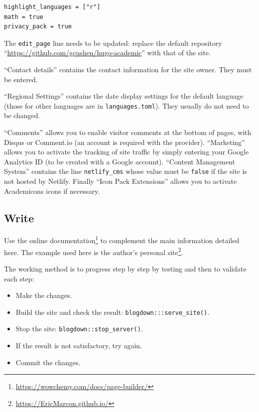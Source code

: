 \documentclass[
  12pt,
  american,
  a4paper,
  extrafontsizes,onecolumn,openright
  ]{memoir}
\providecommand{\tightlist}{%
  \setlength{\itemsep}{0pt}\setlength{\parskip}{0pt}}
\begin{document}
\begin{verbatim}
highlight_languages = ["r"] 
math = true
privacy_pack = true
\end{verbatim}

The \texttt{edit\_page} line needs to be updated: replace the default repository \enquote{\url{https://github.com/gcushen/hugo-academic}} with that of the site.

\enquote{Contact details} contains the contact information for the site owner.
They must be entered.

\enquote{Regional Settings} contains the date display settings for the default language (those for other languages are in \texttt{languages.toml}).
They usually do not need to be changed.

\enquote{Comments} allows you to enable visitor comments at the bottom of pages, with Disqus or Comment.io (an account is required with the provider).
\enquote{Marketing} allows you to activate the tracking of site traffic by simply entering your Google Analytics ID (to be created with a Google account).
\enquote{Content Management System} contains the line \texttt{netlify\_cms} whose value must be \texttt{false} if the site is not hosted by Netlify.
Finally \enquote{Icon Pack Extensions} allows you to activate Academicons icons if necessary.

\subsection{Write}\label{write-2}

Use the online documentation\footnote{\url{https://wowchemy.com/docs/page-builder/}} to complement the main information detailed here.
The example used here is the author's personal site\footnote{\url{https://EricMarcon.github.io/}}.

The working method is to progress step by step by testing and then to validate each step:

\begin{itemize}
\tightlist
\item
  Make the changes.
\item
  Build the site and check the result: \texttt{blogdown:::serve\_site()}.
\item
  Stop the site: \texttt{blogdown::stop\_server()}.
\item
  If the result is not satisfactory, try again.
\item
  Commit the changes.
\end{itemize}
\end{document}
